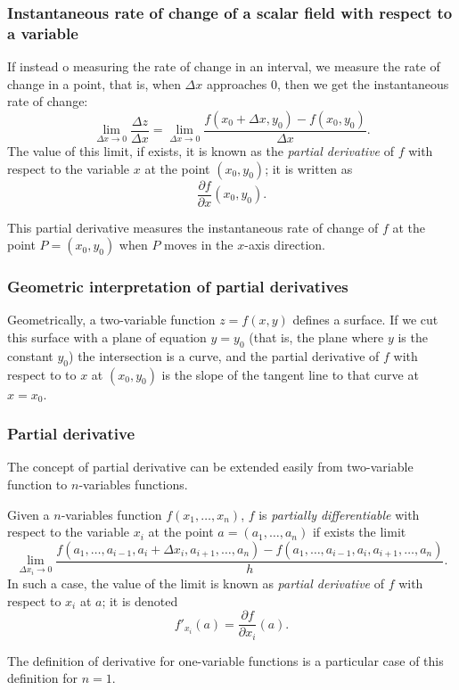 \begin{frame}
\frametitle{Instantaneous rate of change of a scalar field with respect to a variable}
If instead o measuring the rate of change in an interval, we measure the rate of change in a point, that is, when $\Delta x$ approaches 0, then we get the instantaneous rate of change:
\[
\lim_{\Delta x\rightarrow 0}\frac{\Delta z}{\Delta x}=\lim_{\Delta x \rightarrow 0}\frac{f(x_0+\Delta x,y_0)-f(x_0,y_0)}{\Delta x}.
\]
The value of this limit, if exists, it is known as the \emph{partial derivative} of $f$ with respect to the variable $x$ at the point $(x_0,y_0)$; it is written as
\[
\frac{\partial f}{\partial x}(x_0,y_0).
\]

This partial derivative measures the instantaneous rate of change of $f$ at the point $P=(x_0,y_0)$ when $P$ moves in the $x$-axis direction.
\end{frame}


\begin{frame}
\frametitle{Geometric interpretation of partial derivatives}
Geometrically, a two-variable function $z=f(x,y)$ defines a surface.
If we cut this surface with a plane of equation $y=y_0$ (that is, the plane where $y$ is the constant $y_0$)
the intersection is a curve, and the partial derivative of $f$ with respect to to $x$ at $(x_0,y_0)$ is the slope of the tangent line to that curve at $x=x_0$.

\begin{center}

\end{center}
\end{frame}


\begin{frame}
\frametitle{Partial derivative}
The concept of partial derivative can be extended easily from two-variable function to $n$-variables functions.

\begin{definition}
Given a $n$-variables function $f(x_1,\ldots,x_n)$, $f$ is \emph{partially differentiable} with respect to the variable $x_i$ at the point $a=(a_1,\ldots,a_n)$ if exists the limit
\[
\lim_{\Delta x_i\rightarrow 0} \frac{f(a_1,\ldots,a_{i-1},a_i+\Delta x_i,a_{i+1},\ldots,a_n)-f(a_1,\ldots,a_{i-1},a_i,a_{i+1},\ldots,a_n)} {h}.
\]
In such a case, the value of the limit is known as \emph{partial derivative} of $f$ with respect to $x_i$ at $a$; it is denoted
\[
f'_{x_i}(a)=\frac{\partial f}{\partial x_i}(a).
\]
\end{definition}

The definition of derivative for one-variable functions is a particular case of this definition for $n=1$.
\end{frame}



